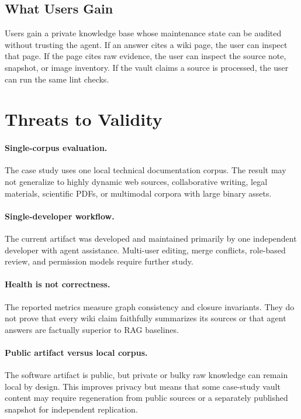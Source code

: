 \documentclass[11pt]{article}
\begin{document}
\subsection{What Users Gain}

Users gain a private knowledge base whose maintenance state can be audited
without trusting the agent. If an answer cites a wiki page, the user can inspect
that page. If the page cites raw evidence, the user can inspect the source note,
snapshot, or image inventory. If the vault claims a source is processed, the
user can run the same lint checks.

\section{Threats to Validity}

\paragraph{Single-corpus evaluation.}
The case study uses one local technical documentation corpus. The result may not
generalize to highly dynamic web sources, collaborative writing, legal
materials, scientific PDFs, or multimodal corpora with large binary assets.

\paragraph{Single-developer workflow.}
The current artifact was developed and maintained primarily by one independent
developer with agent assistance. Multi-user editing, merge conflicts, role-based
review, and permission models require further study.

\paragraph{Health is not correctness.}
The reported metrics measure graph consistency and closure invariants. They do
not prove that every wiki claim faithfully summarizes its sources or that agent
answers are factually superior to RAG baselines.

\paragraph{Public artifact versus local corpus.}
The software artifact is public, but private or bulky raw knowledge can remain
local by design. This improves privacy but means that some case-study vault
content may require regeneration from public sources or a separately published
snapshot for independent replication.
\end{document}

